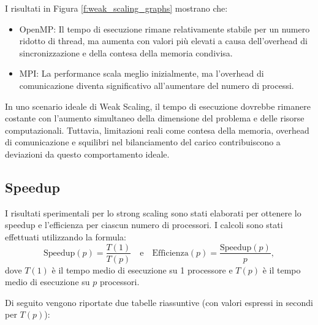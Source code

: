 \documentclass[letterpaper,11pt,leqno]{article}
\begin{document}
I risultati in Figura \ref{f:weak_scaling_graphs} mostrano che:
\begin{itemize}
    \item OpenMP: Il tempo di esecuzione rimane relativamente stabile per un numero ridotto di thread, ma aumenta con valori più elevati a causa dell'overhead di sincronizzazione e della contesa della memoria condivisa.
    \item MPI: La performance scala meglio inizialmente, ma l'overhead di comunicazione diventa significativo all'aumentare del numero di processi.
\end{itemize}

In uno scenario ideale di Weak Scaling, il tempo di esecuzione dovrebbe rimanere costante con l'aumento simultaneo della dimensione del problema e delle risorse computazionali. Tuttavia, limitazioni reali come contesa della memoria, overhead di comunicazione e squilibri nel bilanciamento del carico contribuiscono a deviazioni da questo comportamento ideale.


\subsection{Speedup}

I risultati sperimentali per lo strong scaling sono stati elaborati per ottenere lo speedup e l'efficienza per ciascun numero di processori. I calcoli sono stati effettuati utilizzando la formula:
\[
\text{Speedup}(p) = \frac{T(1)}{T(p)} \quad\text{e}\quad \text{Efficienza}(p) = \frac{\text{Speedup}(p)}{p},
\]
dove \(T(1)\) è il tempo medio di esecuzione su 1 processore e \(T(p)\) è il tempo medio di esecuzione su \(p\) processori.

Di seguito vengono riportate due tabelle riassuntive (con valori espressi in secondi per \(T(p)\)):
\end{document}
